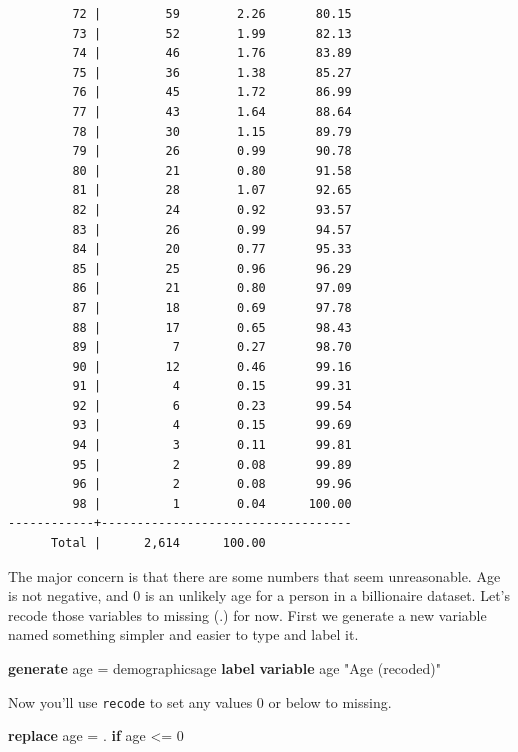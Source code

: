 \documentclass[
]{book}
\newenvironment{Shaded}{\begin{snugshade}}{\end{snugshade}}
\newcommand{\KeywordTok}[1]{\textcolor[rgb]{0.13,0.29,0.53}{\textbf{#1}}}
\newcommand{\NormalTok}[1]{#1}
\newcommand{\StringTok}[1]{\textcolor[rgb]{0.31,0.60,0.02}{#1}}
\begin{document}
\begin{verbatim}
         72 |         59        2.26       80.15
         73 |         52        1.99       82.13
         74 |         46        1.76       83.89
         75 |         36        1.38       85.27
         76 |         45        1.72       86.99
         77 |         43        1.64       88.64
         78 |         30        1.15       89.79
         79 |         26        0.99       90.78
         80 |         21        0.80       91.58
         81 |         28        1.07       92.65
         82 |         24        0.92       93.57
         83 |         26        0.99       94.57
         84 |         20        0.77       95.33
         85 |         25        0.96       96.29
         86 |         21        0.80       97.09
         87 |         18        0.69       97.78
         88 |         17        0.65       98.43
         89 |          7        0.27       98.70
         90 |         12        0.46       99.16
         91 |          4        0.15       99.31
         92 |          6        0.23       99.54
         93 |          4        0.15       99.69
         94 |          3        0.11       99.81
         95 |          2        0.08       99.89
         96 |          2        0.08       99.96
         98 |          1        0.04      100.00
------------+-----------------------------------
      Total |      2,614      100.00
\end{verbatim}

The major concern is that there are some numbers that seem unreasonable. Age is not negative, and 0 is an unlikely age for a person in a billionaire dataset. Let's recode those variables to missing (.) for now. First we generate a new variable named something simpler and easier to type and label it.

\begin{Shaded}
\begin{Highlighting}[]
\KeywordTok{generate}\NormalTok{ age = demographicsage}
\KeywordTok{label} \KeywordTok{variable}\NormalTok{ age }\StringTok{"Age (recoded)"}
\end{Highlighting}
\end{Shaded}

Now you'll use \texttt{recode} to set any values 0 or below to missing.

\begin{Shaded}
\begin{Highlighting}[]
\KeywordTok{replace}\NormalTok{ age = . }\KeywordTok{if}\NormalTok{ age \textless{}= 0}
\end{Highlighting}
\end{Shaded}
\end{document}
